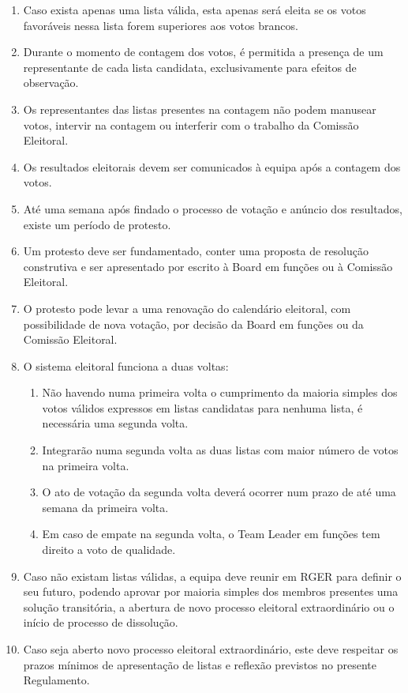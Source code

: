 \begin{enumerate}
  \item Caso exista apenas uma lista válida, esta apenas será eleita se os votos favoráveis nessa lista forem superiores aos votos brancos.
  \item Durante o momento de contagem dos votos, é permitida a presença de um representante de cada lista candidata, exclusivamente para efeitos de observação.
  \item Os representantes das listas presentes na contagem não podem manusear votos, intervir na contagem ou interferir com o trabalho da Comissão Eleitoral.
  \item Os resultados eleitorais devem ser comunicados à equipa após a contagem dos votos.
  \item Até uma semana após findado o processo de votação e anúncio dos resultados, existe um período de protesto.
  \item Um protesto deve ser fundamentado, conter uma proposta de resolução construtiva e ser apresentado por escrito à Board em funções ou à Comissão Eleitoral.
  \item O protesto pode levar a uma renovação do calendário eleitoral, com possibilidade de nova votação, por decisão da Board em funções ou da Comissão Eleitoral.
  \item O sistema eleitoral funciona a duas voltas:
  \begin{enumerate}
    \item Não havendo numa primeira volta o cumprimento da maioria simples dos votos válidos expressos em listas candidatas para nenhuma lista, é necessária uma segunda volta.
    \item Integrarão numa segunda volta as duas listas com maior número de votos na primeira volta.
    \item O ato de votação da segunda volta deverá ocorrer num prazo de até uma semana da primeira volta.
    \item Em caso de empate na segunda volta, o Team Leader em funções tem direito a voto de qualidade.
  \end{enumerate}
  \item Caso não existam listas válidas, a equipa deve reunir em RGER para definir o seu futuro, podendo aprovar por maioria simples dos membros presentes uma solução transitória, a abertura de novo processo eleitoral extraordinário ou o início de processo de dissolução.
  \item Caso seja aberto novo processo eleitoral extraordinário, este deve respeitar os prazos mínimos de apresentação de listas e reflexão previstos no presente Regulamento.
\end{enumerate}

